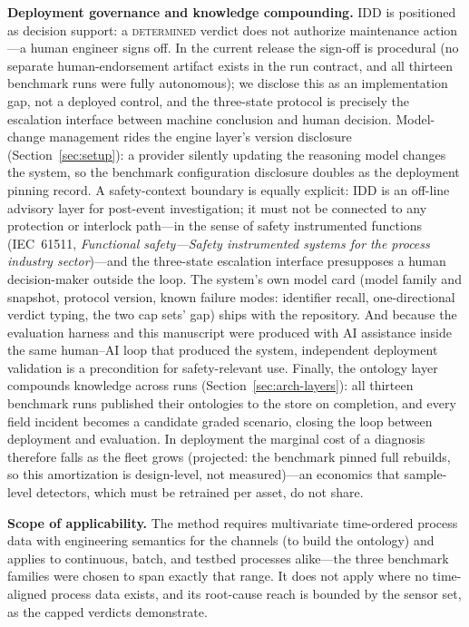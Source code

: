 \documentclass[preprint,12pt]{elsarticle}
\begin{document}
\textbf{Deployment governance and knowledge compounding.} IDD is positioned as decision support: a \mbox{\textsc{determined}} verdict does not authorize maintenance action---a human engineer signs off. In the current release the sign-off is procedural (no separate human-endorsement artifact exists in the run contract, and all thirteen benchmark runs were fully autonomous); we disclose this as an implementation gap, not a deployed control, and the three-state protocol is precisely the escalation interface between machine conclusion and human decision. Model-change management rides the engine layer's version disclosure (Section~\ref{sec:setup}): a provider silently updating the reasoning model changes the system, so the benchmark configuration disclosure doubles as the deployment pinning record. A safety-context boundary is equally explicit: IDD is an off-line advisory layer for post-event investigation; it must not be connected to any protection or interlock path---in the sense of safety instrumented functions (IEC~61511, \emph{Functional safety---Safety instrumented systems for the process industry sector})---and the three-state escalation interface presupposes a human decision-maker outside the loop. The system's own model card (model family and snapshot, protocol version, known failure modes: identifier recall, one-directional verdict typing, the two cap sets' gap) ships with the repository. And because the evaluation harness and this manuscript were produced with AI assistance inside the same human--AI loop that produced the system, independent deployment validation is a precondition for safety-relevant use. Finally, the ontology layer compounds knowledge across runs (Section~\ref{sec:arch-layers}): all thirteen benchmark runs published their ontologies to the store on completion, and every field incident becomes a candidate graded scenario, closing the loop between deployment and evaluation. In deployment the marginal cost of a diagnosis therefore falls as the fleet grows (projected: the benchmark pinned full rebuilds, so this amortization is design-level, not measured)---an economics that sample-level detectors, which must be retrained per asset, do not share.

\textbf{Scope of applicability.} The method requires multivariate time-ordered process data with engineering semantics for the channels (to build the ontology) and applies to continuous, batch, and testbed processes alike---the three benchmark families were chosen to span exactly that range. It does not apply where no time-aligned process data exists, and its root-cause reach is bounded by the sensor set, as the capped verdicts demonstrate.
\end{document}
